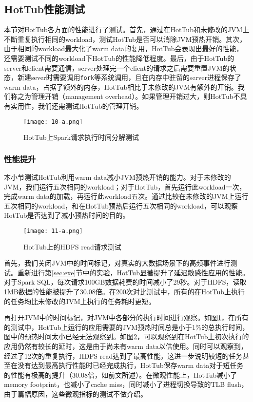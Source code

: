 \documentclass[lang=cn,12pt,a4paper,cite=authoryear]{elegantpaper}
\begin{document}
\subsection{HotTub性能测试}
本节对HotTub各方面的性能进行了测试。首先，通过在HotTub和未修改的JVM上不断重复执行相同的workload，测试HotTub是否可以消除JVM预热开销。其次，由于相同的workload最大化了warm data的复用，HotTub会表现出最好的性能，还需要测试不同的workload下HotTub的性能降低程度。最后，由于HotTub的server和client需要通信，server处理完一个client的请求之后需要重置JVM的状态，新建sever时需要调用\texttt{fork}等系统调用，且在内存中驻留的server进程保存了warm data，占据了额外的内存，HotTub相比于未修改的JVM有额外的开销。我们称之为管理开销（management overhead）。如果管理开销过大，则HotTub不具有实用性，我们还需测试HotTub的管理开销。

\begin{figure}[!htp]
  \centering
  \texttt{[image: 10-a.png]}
  \caption{HotTub上Spark请求执行时间分解测试}
  \label{fig:aaa}
\end{figure}

\subsubsection{性能提升}
本小节测试HotTub利用warm data减小JVM预热开销的能力。对于未修改的JVM，我们运行五次相同的workload；对于HotTub，首先运行此workload一次，完成warm data的加载，再运行此workload五次。通过比较在未修改的JVM上运行五次相同的workload，和在HotTub预热后运行五次相同的workload，可以观察HotTub是否达到了减小预热时间的目的。

\begin{figure}[!htp]
  \centering
  \texttt{[image: 11-a.png]}
  \caption{HotTub上的HDFS read请求测试}
  \label{fig:bbb}
\end{figure}

首先，我们关闭JVM中的时间标记，对真实的大数据场景下的高频事件进行测试。重新进行第\ref{sec:exe}节中的实验，HotTub显著提升了延迟敏感性应用的性能。对于Spark SQL，每次请求100GB数据耗费的时间减小了29秒。对于HDFS，读取1MB数据的性能被提升了30.08倍。在200次对比测试中，所有的在HotTub上执行的任务均比未修改的JVM上执行的任务耗时更短。

再打开JVM中的时间标记，对JVM中各部分的执行时间进行观察。如图\ref{fig:aaa}，在所有的测试中，HotTub上运行的应用需要的JVM预热时间总是小于1\%的总执行时间，图中的预热时间太小已经无法观察到。如图\ref{fig:bbb}，可以观察到在HotTub上初次执行的应用仍然有较长的延时，这是由于尚未有warm data以供使用。同时可以观察到，经过了12次的重复执行，HDFS read达到了最高性能，这进一步说明较短的任务甚至在没有达到最高执行性能时已经完成执行，HotTub保存warm data对于短任务的性能有极高的提升（30.08倍，如前文所述）。在微观性能上，HotTub减小了memory footprint，也减小了cache miss，同时减小了进程切换导致的TLB flush，由于篇幅原因，这些微观指标的测试不做介绍。
\end{document}
